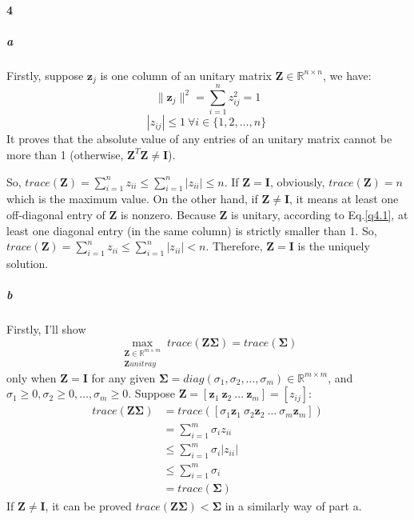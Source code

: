 \documentclass[22pt]{article}
\begin{document}
	\paragraph{4}
	\subparagraph{a}
	 Firstly, suppose $\mathbf{z}_j$ is one column of an unitary matrix $\mathbf{Z} \in \mathbb{R}^{n\times n}$, we have:
	\begin{equation}
		\|\mathbf{z}_j\|^2 = \sum\limits_{i=1}^{n}z_{ij}^2 = 1 \label{q4.1}
	\end{equation}
	\begin{equation}
		 |z_{ij}|\leq 1\ \forall i \in \{1,2,\dots,n\}\
	\end{equation}
	It proves that the absolute value of any entries of an unitary matrix cannot be more than 1 (otherwise, $\mathbf{Z}^T\mathbf{Z} \not= \mathbf{I}$).

	So, $trace(\mathbf{Z}) = \sum\limits_{i=1}^{n}z_{ii} \leq \sum\limits_{i=1}^{n}|z_{ii}| \leq n$. If $\mathbf{Z=I}$, obviously, $trace(\mathbf{Z}) = n$ which is the maximum value. On the other hand, if $\mathbf{Z \not= I}$, it means at least one off-diagonal entry of $\mathbf{Z}$ is nonzero.  Because $\mathbf{Z}$ is unitary, according to Eq.\ref{q4.1}, at least one diagonal entry (in the same column) is strictly smaller than 1. So, $trace(\mathbf{Z}) = \sum\limits_{i=1}^{n}z_{ii} \leq \sum\limits_{i=1}^{n}|z_{ii}| < n$. Therefore, $\mathbf{Z=I}$ is the uniquely solution.

	\subparagraph{b} Firstly, I'll show \begin{equation}
		\max_{\substack{\mathbf{Z}\in \mathbb{R}^{m\times m}\\ \mathbf{Z} unitray}} trace(\mathbf{Z \Sigma}) = trace(\mathbf{\Sigma})	\label{q4}
	\end{equation}
	only when $\mathbf{Z = I}$ for any given $\mathbf{\Sigma} = diag(\sigma_1,\sigma_2,\dots,\sigma_m) \in \mathbb{R}^{m \times m}$, and $\sigma_1 \geq 0, \sigma_2 \geq 0, \dots, \sigma_m \geq 0$. Suppose $\mathbf{Z} = [\mathbf{z}_1\ \mathbf{z}_2\ \dots\ \mathbf{z}_m] = [z_{ij}]$:
	\begin{align}
		trace(\mathbf{Z \Sigma}) & = trace([\sigma_1\mathbf{z}_1\ \sigma_2\mathbf{z}_2\ \dots\ \sigma_m\mathbf{z}_m])\\
		& = \sum\limits_{i=1}^{m}\sigma_iz_{ii}\\
		& \leq \sum\limits_{i=1}^{m}\sigma_i|z_{ii}|\\
		& \leq \sum\limits_{i=1}^{m}\sigma_i\\
		& = trace(\mathbf{\Sigma})
	\end{align}
	If $\mathbf{Z \not= I}$, it can be proved $trace(\mathbf{Z \Sigma}) < \mathbf{\Sigma}$ in a similarly way of part a.
\end{document}
